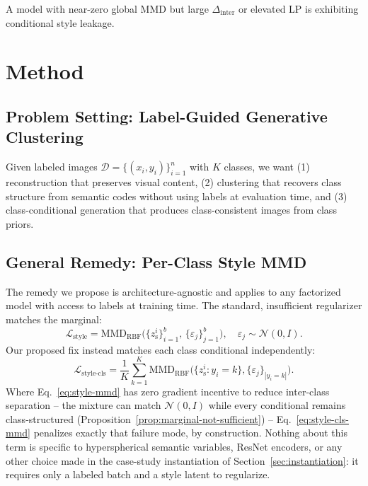 \documentclass[10pt,letterpaper]{article}
\newcommand{\zs}{z_{\mathrm{s}}}
\newcommand{\MMD}{\mathrm{MMD}}
\begin{document}
A model with near-zero global MMD but large $\Delta_{\mathrm{inter}}$ or
elevated LP is exhibiting conditional style leakage.

\section{Method}
\label{sec:method}

\subsection{Problem Setting: Label-Guided Generative Clustering}

Given labeled images $\mathcal{D}=\{(x_i,y_i)\}_{i=1}^n$ with $K$ classes,
we want (1) reconstruction that preserves visual content, (2) clustering
that recovers class structure from semantic codes without using labels at
evaluation time, and (3) class-conditional generation that produces
class-consistent images from class priors.

\subsection{General Remedy: Per-Class Style MMD}
\label{sec:general-remedy}

The remedy we propose is architecture-agnostic and applies to any
factorized model with access to labels at training time. The standard,
insufficient regularizer matches the marginal:
\begin{equation}
  \mathcal{L}_{\mathrm{style}} = \MMD_{\mathrm{RBF}}\!\bigl(\{\zs^i\}_{i=1}^b,\,\{\varepsilon_j\}_{j=1}^b\bigr),
  \quad \varepsilon_j\sim\mathcal N(0,I).
  \label{eq:style-mmd}
\end{equation}
Our proposed fix instead matches each class conditional independently:
\begin{equation}
  \mathcal{L}_{\mathrm{style\text{-}cls}} = \frac{1}{K}\sum_{k=1}^{K}
    \MMD_{\mathrm{RBF}}\!\bigl(\{\zs^i:y_i{=}k\},\{\varepsilon_j\}_{|y_i=k|}\bigr).
  \label{eq:style-cls-mmd}
\end{equation}
Where Eq.~\ref{eq:style-mmd} has zero gradient incentive to reduce
inter-class separation -- the mixture can match $\mathcal N(0,I)$ while
every conditional remains class-structured
(Proposition~\ref{prop:marginal-not-sufficient}) -- Eq.~\ref{eq:style-cls-mmd}
penalizes exactly that failure mode, by construction. Nothing about this
term is specific to hyperspherical semantic variables, ResNet encoders, or
any other choice made in the case-study instantiation of
Section~\ref{sec:instantiation}: it requires only a labeled batch and a
style latent to regularize.
\end{document}
